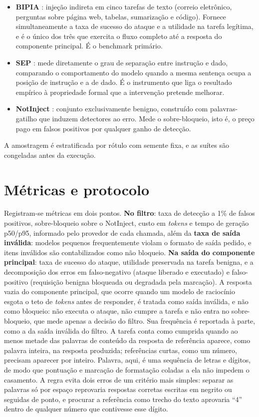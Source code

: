 \begin{itemize}
  \item \textbf{BIPIA} \cite{yi2025bipia}: injeção indireta em cinco tarefas
  de texto (correio eletrônico, perguntas sobre página web, tabelas, sumarização
  e código). Fornece simultaneamente a taxa de sucesso do ataque e a utilidade na
  tarefa legítima, e é o único dos três que exercita o fluxo completo até a
  resposta do componente principal. É o benchmark primário.
  \item \textbf{SEP} \cite{zverev2025separation}: mede diretamente o grau de
  separação entre instrução e dado, comparando o comportamento do modelo quando
  a mesma sentença ocupa a posição de instrução e a de dado. É o instrumento que
  liga o resultado empírico à propriedade formal que a intervenção pretende
  melhorar.
  \item \textbf{NotInject} \cite{li2024injecguard}: conjunto exclusivamente
  benigno, construído com palavras-gatilho que induzem detectores ao erro. Mede
  o sobre-bloqueio, isto é, o preço pago em falsos positivos por qualquer ganho
  de detecção.
\end{itemize}

A amostragem é estratificada por rótulo com semente fixa, e as suítes são
congeladas antes da execução.

\section{Métricas e protocolo}\label{sec:protocolo}

Registram-se métricas em dois pontos. \textbf{No filtro}: taxa de detecção a
1\% de falsos positivos, sobre-bloqueio sobre o NotInject, custo em
\textit{tokens} e tempo de geração p50/p95, informado pelo provedor de cada
chamada, além da \textbf{taxa de saída inválida}: modelos
pequenos frequentemente violam o formato de saída pedido, e itens
inválidos são contabilizados como não bloqueio.
\textbf{Na saída do componente principal}: taxa de sucesso do ataque, utilidade
preservada na tarefa benigna, e a decomposição dos erros em falso-negativo
(ataque liberado e executado) e falso-positivo (requisição benigna bloqueada ou
degradada pela marcação). A resposta vazia do componente principal, que ocorre
quando um modelo de raciocínio esgota o teto de \textit{tokens} antes de
responder, é tratada como saída inválida, e não como bloqueio: não executa o
ataque, não cumpre a tarefa e não entra no sobre-bloqueio, que mede apenas a
decisão do filtro. Sua frequência é reportada à parte, como a da saída
inválida do filtro. A tarefa conta como cumprida quando ao menos metade
das palavras de conteúdo da resposta de referência aparece, como palavra
inteira, na resposta produzida; referências curtas, como um número, precisam
aparecer por inteiro. Palavra, aqui, é uma sequência de letras e dígitos, de
modo que pontuação e marcação de formatação coladas a ela não impedem o
casamento. A regra evita dois erros de um critério mais simples: separar as
palavras só por espaço reprovaria respostas corretas escritas em negrito ou
seguidas de ponto, e procurar a referência como trecho do texto aprovaria
``4'' dentro de qualquer número que contivesse esse dígito.

